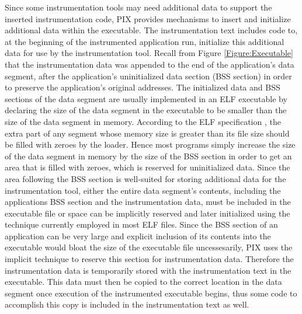 Since some instrumentation tools may need additional data to support the inserted instrumentation code,
PIX provides mechanisms to insert and initialize additional data within the executable.
The instrumentation text includes code to, at the beginning of the instrumented 
application run, initialize this additional data for use by the
instrumentation tool. Recall from Figure \ref{Figure:Executable} that the instrumentation
data was appended to the end of the application's data segment, after the
application's uninitialized data section (BSS section) in order to preserve the application's 
original addresses. The initialized data and BSS
sections of the data segment are usually implemented in an ELF executable by declaring the size of
the data segment in the executable to be smaller than the size of the data
segment in memory. According to the ELF specification \cite{standard1995executable}, the extra part of any
segment whose memory size is greater than its file size should be filled with
zeroes by the loader. Hence most programs simply increase the size of the data
segment in memory by the size of the BSS section in order to get an
area that is filled with zeroes, which is reserved for uninitialized data. Since the area following the BSS section is well-suited for
storing additional data for the instrumentation tool, either the entire data
segment's contents, including the applications BSS section and the instrumentation data,
must be included in the executable file or space can be implicitly reserved and later initialized using the
technique currently employed in most ELF files.
Since the BSS section of an application can be very large and explicit inclusion of its contents
into the executable would bloat the size of the executable file uncessesarily, PIX uses the implicit
technique to reserve this section for instrumentation data. Therefore the instrumentation data is
temporarily stored with the instrumentation text in the
executable. This data must then be copied to the correct location in the data segment once execution
of the instrumented executable begins, thus some code to accomplish this copy is included in the
instrumentation text as well.
